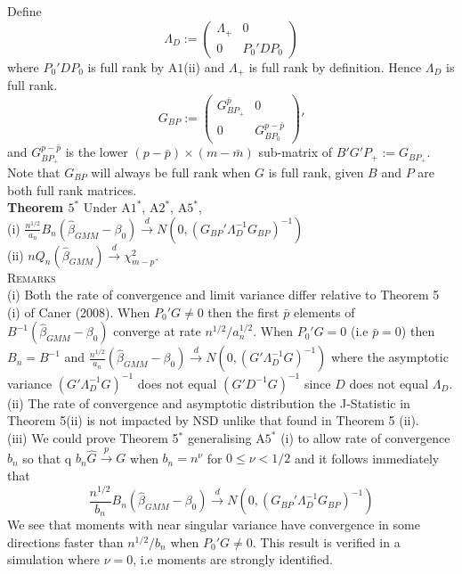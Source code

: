 \documentclass[11pt, fleqn]{article}
\begin{document}
Define
  \begin{equation}
  \Lambda_D :=\left(\begin{array}{cc} \Lambda_+ & 0\\ 0& P_0'DP_0\end{array}\right)
  \end{equation}
  where $P_0'DP_0$ is full rank by A$1$(ii) and $\Lambda_+ $ is full rank by definition. Hence $\Lambda_D$ is full rank.
  \begin{equation}G_{BP}:=\left(\begin{array}{cc}   G_{BP_+}^{\bar{p}} & 0\\ 0 &  G_{BP_0}^{p-\bar{p}}   \end{array}   \right)' \end{equation} and $ G_{BP_+}^{p-\bar{p}} $ is the lower $(p-\bar{p})\times (m-\bar{m})$ sub-matrix of  $B'G'P_+:=G_{BP_+}$. Note that $G_{BP}$ will always be full rank when $G$ is full rank, given $B$ and $P$ are both full rank matrices.\\

\textbf{Theorem $5^*$}  Under A$1^*$, A$2^*$, A$5^*$,\\
(i) $ \label{limit}\frac{n^{1/2}}{a_n}B_n(\hat{\beta}_{GMM}-\beta_0)\overset{d}{\rightarrow} N(0,(G_{BP}'\Lambda_D^{-1}G_{BP})^{-1})$\\
(ii) $nQ_n(\hat{\beta}_{GMM})\overset{d}{\rightarrow} \chi^2_{m-p}$.\\

\textsc{Remarks}\\
(i) Both the rate of convergence and limit variance differ relative to Theorem 5 (i) of Caner (2008).  When $P_0'G\neq 0$ then the first $\bar{p}$ elements of $B^{-1}(\hat{\beta}_{GMM}-\beta_0)$ converge at rate $n^{1/2}/a_n^{1/2}$. When $P_0'G=0$ (i.e $\bar{p}=0$) then $B_n=B^{-1}$ and $\frac{n^{1/2}}{a_n}(\hat{\beta}_{GMM}-\beta_0)\overset{d}{\rightarrow} N(0,(G'\Lambda_D^{-1}G)^{-1})$ where the asymptotic variance $(G'\Lambda_D^{-1}G)^{-1}$ does not equal $(G'D^{-1}G)^{-1}$ since $D$ does not equal $\Lambda_D$.\\
(ii) The rate of convergence and asymptotic distribution the J-Statistic  in Theorem 5(ii) is not impacted by NSD unlike that found in Theorem 5 (ii).\\
(iii) We could prove Theorem 5$^*$ generalising  A$5^*$ (i) to allow  rate of convergence $b_n$ so that q $b_n\hat{G}\overset{p}{\rightarrow}G$ when $b_n=n^{\nu}$ for $0\leq \nu <1/2$ and it follows immediately that
\begin{equation}\label{ij}\frac{n^{1/2}}{b_n}B_n(\hat{\beta}_{GMM}-\beta_0)\overset{d}{\rightarrow} N(0,(G_{BP}'\Lambda_D^{-1}G_{BP})^{-1})\end{equation} We see that moments with near singular variance have convergence in some directions faster than $n^{1/2}/b_n$ when $P_0'G \neq 0$.  This result is verified in a simulation where $\nu=0$, i.e moments are strongly identified.
\end{document}
